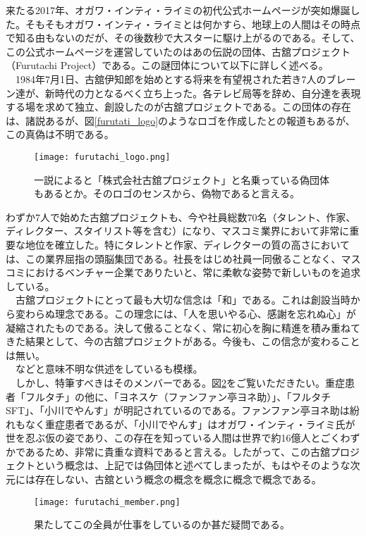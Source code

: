 来たる2017年、オガワ・インティ・ライミの初代公式ホームページが突如爆誕した。そもそもオガワ・インティ・ライミとは何かすら、地球上の人間はその時点で知る由もないのだが、その後数秒で大スターに駆け上がるのである。そして、この公式ホームページを運営していたのはあの伝説の団体、古舘プロジェクト（Furutachi Project）である。この謎団体について以下に詳しく述べる。\\
　1984年7月1日、古舘伊知郎を始めとする将来を有望視された若き7人のブレーン達が、新時代の力となるべく立ち上った。各テレビ局等を辞め、自分達を表現する場を求めて独立、創設したのが古舘プロジェクトである。この団体の存在は、諸説あるが、図\ref{furutati_logo}のようなロゴを作成したとの報道もあるが、この真偽は不明である。\\
\begin{figure}[H]
  \centering
  \texttt{[image: furutachi\_logo.png]}
  \caption{一説によると「株式会社古舘プロジェクト」と名乗っている偽団体もあるとか。そのロゴのセンスから、偽物であると言える。}
\label{furutachi_logo}
\end{figure}
わずか7人で始めた古舘プロジェクトも、今や社員総数70名（タレント、作家、ディレクター、スタイリスト等を含む）になり、マスコミ業界において非常に重要な地位を確立した。特にタレントと作家、ディレクターの質の高さにおいては、この業界屈指の頭脳集団である。社長をはじめ社員一同傲ることなく、マスコミにおけるベンチャー企業でありたいと、常に柔軟な姿勢で新しいものを追求している。\\
　古舘プロジェクトにとって最も大切な信念は「和」である。これは創設当時から変わらぬ理念である。この理念には、「人を思いやる心、感謝を忘れぬ心」が凝縮されたものである。決して傲ることなく、常に初心を胸に精進を積み重ねてきた結果として、今の古舘プロジェクトがある。今後も、この信念が変わることは無い。\\
　などと意味不明な供述をしているも模様。\\
　しかし、特筆すべきはそのメンバーである。図\ref{furutachi_member}をご覧いただきたい。重症患者「フルタチ」の他に、「ヨネスケ（ファンファン亭ヨネ助）」、「フルタチSFT」、「小川でやんす」が明記されているのである。ファンファン亭ヨネ助は紛れもなく重症患者であるが、「小川でやんす」はオガワ・インティ・ライミ氏が世を忍ぶ仮の姿であり、この存在を知っている人間は世界で約16億人とごくわずかであるため、非常に貴重な資料であると言える。したがって、この古舘プロジェクトという概念は、上記では偽団体と述べてしまったが、もはやそのような次元には存在しない、古舘という概念の概念を概念に概念で概念である。

\begin{figure}[H]
  \centering
  \texttt{[image: furutachi\_member.png]}
  \caption{果たしてこの全員が仕事をしているのか甚だ疑問である。}
\label{furutachi_member}
\end{figure}

